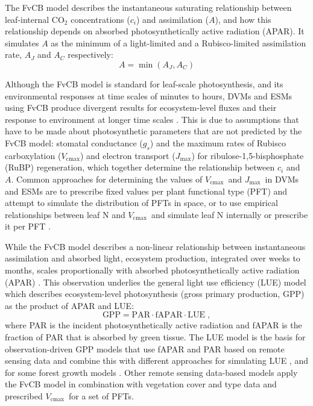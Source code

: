 \documentclass[gmd, manuscript]{copernicus}
\newcommand{\vcmax}{$V_{\text{cmax}}$}
\newcommand{\jmax}{$J_{\text{max}}$}
\begin{document}
The FvCB model describes the instantaneous saturating relationship between leaf-internal CO$_2$ concentrations ($c_i$) and assimilation ($A$), and how this relationship depends on absorbed photosynthetically active radiation (APAR). It simulates $A$ as the minimum of a light-limited and a Rubisco-limited assimilation rate, $A_J$ and $A_C$ respectively:
\begin{equation}
    A = \min(A_J, A_C)
\end{equation}

Although the FvCB model is standard for leaf-scale photosynthesis, and its environmental responses at time scales of minutes to hours, DVMs and ESMs using FvCB produce divergent results for ecosystem-level fluxes and their response to environment at longer time scales \citep{rogers17}. This is due to assumptions that have to be made about photosynthetic parameters that are not predicted by the FvCB model: stomatal conductance ($g_s$) and the maximum rates of Rubisco carboxylation (\vcmax ) and electron transport (\jmax ) for ribulose-1,5-bisphosphate (RuBP) regeneration, which together determine the relationship between $c_i$ and $A$. Common approaches for determining the values of \vcmax\ and \jmax\ in DVMs and ESMs are to prescribe fixed values per plant functional type (PFT) and attempt to simulate the distribution of PFTs in space, or to use empirical relationships between leaf N and \vcmax\ and simulate leaf N internally or prescribe it per PFT \citep{smithdukes13gcb, rogers14}. 

While the FvCB model describes a non-linear relationship between instantaneous assimilation and absorbed light, ecosystem production, integrated over weeks to months, scales proportionally with absorbed photosynthetically active radiation (APAR) \citep{monteith72, medlyn98}. This observation underlies the general light use efficiency (LUE) model which describes ecosystem-level photosynthesis (gross primary production, GPP) as the product of APAR and LUE:
\begin{equation}
\label{eq:luemodel}
\text{GPP} = \text{PAR} \cdot \text{fAPAR} \cdot \text{LUE} \;,
\end{equation}
where PAR is the incident photosynthetically active radiation and fAPAR is the fraction of PAR that is absorbed by green tissue. The LUE model is the basis for observation-driven GPP models that use fAPAR and PAR based on remote sensing data and combine this with different approaches for simulating LUE \citep{running04, Zhang2017-yr, field95rse}, and for some forest growth models \citep{landsberg97fem}. Other remote sensing data-based models \citep{jiang16rse} apply the FvCB model in combination with vegetation cover and type data and prescribed \vcmax\ for a set of PFTs.
\end{document}
